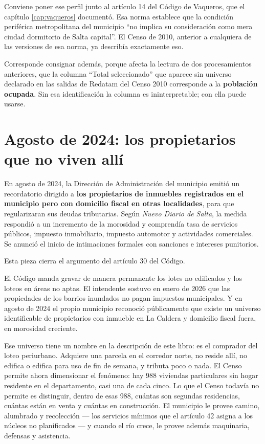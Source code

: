 Conviene poner ese perfil junto al artículo 14 del Código de Vaqueros, que el capítulo \ref{cap:vaqueros} documentó. Esa norma establece que la condición periférica metropolitana del municipio ``no implica su consideración como mera ciudad dormitorio de Salta capital''. El Censo de 2010, anterior a cualquiera de las versiones de esa norma, ya describía exactamente eso.

Corresponde consignar además, porque afecta la lectura de dos procesamientos anteriores, que la columna ``Total seleccionado'' que aparece sin universo declarado en las salidas de Redatam del Censo 2010 corresponde a la \textbf{población ocupada}. Sin esa identificación la columna es ininterpretable; con ella puede usarse.
\section{Agosto de 2024: los propietarios que no viven allí}

En agosto de 2024, la Dirección de Administración del municipio emitió un recordatorio dirigido a \textbf{los propietarios de inmuebles registrados en el municipio pero con domicilio fiscal en otras localidades}, para que regularizaran sus deudas tributarias. Según \textit{Nuevo Diario de Salta}, la medida respondió a un incremento de la morosidad y comprendía tasa de servicios públicos, impuesto inmobiliario, impuesto automotor y actividades comerciales. Se anunció el inicio de intimaciones formales con sanciones e intereses punitorios.

Esta pieza cierra el argumento del artículo 30 del Código.

El Código manda gravar de manera permanente los lotes no edificados y los loteos en áreas no aptas. El intendente sostuvo en enero de 2026 que las propiedades de los barrios inundados no pagan impuestos municipales. Y en agosto de 2024 el propio municipio reconoció públicamente que existe un universo identificable de propietarios con inmueble en La Caldera y domicilio fiscal fuera, en morosidad creciente.

Ese universo tiene un nombre en la descripción de este libro: es el comprador del loteo periurbano. Adquiere una parcela en el corredor norte, no reside allí, no edifica o edifica para uso de fin de semana, y tributa poco o nada. El Censo permite ahora dimensionar el fenómeno: hay 988 viviendas particulares sin hogar residente en el departamento, casi una de cada cinco. Lo que el Censo todavía no permite es distinguir, dentro de esas 988, cuántas son segundas residencias, cuántas están en venta y cuántas en construcción. El municipio le provee camino, alumbrado y recolección --- los servicios mínimos que el artículo 42 asigna a los núcleos no planificados --- y cuando el río crece, le provee además maquinaria, defensas y asistencia.

